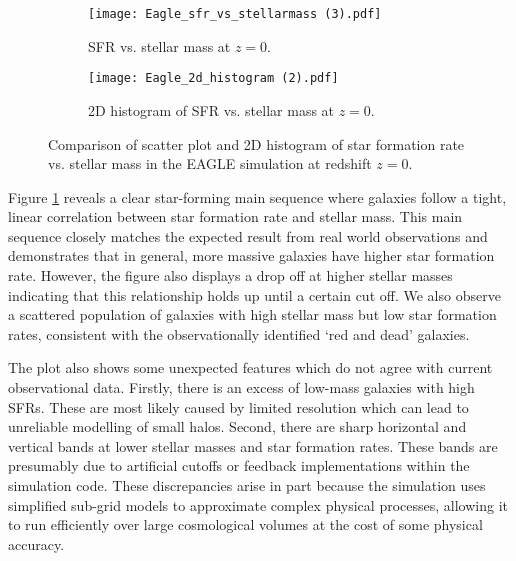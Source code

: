 \documentclass[10pt]{article}
\begin{document}
\begin{figure}[H]
    \centering
    \begin{subfigure}[t]{0.48\textwidth}
        \centering
        \texttt{[image: Eagle\_sfr\_vs\_stellarmass (3).pdf]}
        \caption{SFR vs. stellar mass at $ z = 0 $.\\\vspace{0.35cm}}  %
        \label{fig:eagle_sfr_mass}
    \end{subfigure}
    \hfill
    \begin{subfigure}[t]{0.48\textwidth}
        \centering
        \texttt{[image: Eagle\_2d\_histogram (2).pdf]}
        \caption{2D histogram of SFR vs. stellar mass at $ z = 0 $.}
        \label{fig:eagle_hist2d}
    \end{subfigure}
    \caption{Comparison of scatter plot and 2D histogram of star formation rate vs. stellar mass in the EAGLE simulation at redshift $z = 0 $.}
    \label{fig:eagle_comparison}
\end{figure}

Figure \ref{fig:eagle_sfr_mass} reveals a clear star-forming main sequence where galaxies follow a tight, linear correlation between star formation rate and stellar mass. This main sequence closely matches the expected result from real world observations and demonstrates that in general, more massive galaxies have higher star formation rate. However, the figure also displays a drop off at higher stellar masses indicating that this relationship holds up until a certain cut off. We also observe a scattered population of galaxies with high stellar mass but low star formation rates, consistent with the observationally identified `red and dead' galaxies. 

The plot also shows some unexpected features which do not agree with current observational data. Firstly, there is an excess of low-mass galaxies with high SFRs. These are most likely caused by limited resolution which can lead to unreliable modelling of small halos. Second, there are sharp horizontal and vertical bands at lower stellar masses and star formation rates. These bands are presumably due to artificial cutoffs or feedback implementations within the simulation code. These discrepancies arise in part because the simulation uses simplified sub-grid models to approximate complex physical processes, allowing it to run efficiently over large cosmological volumes at the cost of some physical accuracy. 
\end{document}
